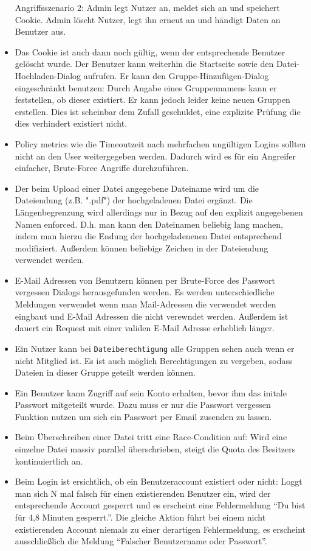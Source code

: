 \documentclass[12pt,DIV14,BCOR10mm,a4paper,parskip=half-,headsepline,headinclude,english,ngerman,bibliography=totocnumbered]{scrreprt}
\begin{document}
\begin{itemize}
Angriffsszenario 2: Admin legt Nutzer an, meldet sich an und speichert Cookie. Admin löscht Nutzer, legt ihn erneut an und händigt Daten an Benutzer aus.
  \item Das Cookie ist auch dann noch gültig, wenn der entsprechende Benutzer gelöscht wurde. Der Benutzer kann weiterhin die Startseite sowie den Datei-Hochladen-Dialog aufrufen. Er kann den Gruppe-Hinzufügen-Dialog eingeschränkt benutzen: Durch Angabe eines Gruppennamens kann er feststellen, ob dieser existiert. Er kann jedoch leider keine neuen Gruppen erstellen. Dies ist scheinbar dem Zufall geschuldet, eine explizite Prüfung die dies verhindert existiert nicht.
  \item Policy metrics wie die Timeoutzeit nach mehrfachen ungültigen Logins sollten nicht an den User weitergegeben werden. Dadurch wird es für ein Angreifer einfacher, Brute-Force Angriffe durchzuführen. \autocite[Loc. 5087]{book:wahh}
  \item Der beim Upload einer Datei angegebene Dateiname wird um die Dateiendung (z.B. ".pdf") der hochgeladenen Datei ergänzt. Die Längenbegrenzung wird allerdings nur in Bezug auf den explizit angegebenen Namen enforced. D.h. man kann den Dateinamen beliebig lang machen, indem man hierzu die Endung der hochgeladenenen Datei entsprechend modifiziert. Außerdem können beliebige Zeichen in der Dateiendung verwendet werden.
  \item E-Mail Adressen von Benutzern können per Brute-Force des Passwort vergessen Dialogs herausgefunden werden. Es werden unterschiedliche Meldungen verwendet wenn man Mail-Adressen die verwendet werden eingbaut und E-Mail Adressen die nicht verewndet werden. Außerdem ist dauert ein Request mit einer validen E-Mail Adresse erheblich länger.
  \item Ein Nutzer kann bei \texttt{Dateiberechtigung} alle Gruppen sehen auch wenn er nicht Mitglied ist. Es ist auch möglich Berechtigungen zu vergeben, sodass Dateien in dieser Gruppe geteilt werden können.
\item Ein Benutzer kann Zugriff auf sein Konto erhalten, bevor ihm das initale Passwort mitgeteilt wurde. Dazu muss er nur die Passwort vergessen Funktion nutzen um sich ein Passwort per Email zusenden zu lassen.
\item Beim Überschreiben einer Datei tritt eine Race-Condition auf: Wird eine einzelne Datei massiv parallel überschrieben, steigt die Quota des Besitzers kontinuiertlich an.
\item Beim Login ist ersichtlich, ob ein Benutzeraccount existiert oder nicht: Loggt man sich N mal falsch für einen existierenden Benutzer ein, wird der entsprechende Account gesperrt und es erscheint eine Fehlermeldung \enquote{Du bist für 4,8 Minuten gesperrt.}. Die gleiche Aktion führt bei einem nicht existierenden Account niemals zu einer derartigen Fehlermeldung, es erscheint ausschließlich die Meldung \enquote{Falscher Benutzername oder Passwort}.

\end{itemize}
\end{document}
